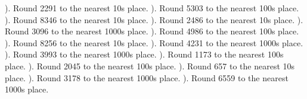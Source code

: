 \documentclass{article}%
\begin{document}
). Round 2291 to the nearest 10s place.%
\newline%
\newline%
). Round 5303 to the nearest 100s place.%
\newline%
\newline%
). Round 8346 to the nearest 10s place.%
\newline%
\newline%
). Round 2486 to the nearest 10s place.%
\newline%
\newline%
). Round 3096 to the nearest 1000s place.%
\newline%
\newline%
). Round 4986 to the nearest 100s place.%
\newline%
\newline%
). Round 8256 to the nearest 10s place.%
\newline%
\newline%
). Round 4231 to the nearest 1000s place.%
\newline%
\newline%
). Round 3993 to the nearest 1000s place.%
\newline%
\newline%
). Round 1173 to the nearest 100s place.%
\newline%
\newline%
). Round 2045 to the nearest 100s place.%
\newline%
\newline%
). Round 657 to the nearest 10s place.%
\newline%
\newline%
). Round 3178 to the nearest 1000s place.%
\newline%
\newline%
). Round 6559 to the nearest 1000s place.%
\end{document}
